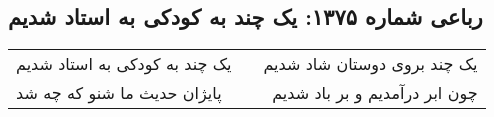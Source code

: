 \begin{center}
\section*{رباعی شماره ۱۳۷۵: یک چند به کودکی به استاد شدیم}
\label{sec:1375}
\begin{longtable}{l p{0.5cm} r}
یک چند به کودکی به استاد شدیم
&&
یک چند بروی دوستان شاد شدیم
\\
پایژان حدیث ما شنو که چه شد
&&
چون ابر درآمدیم و بر باد شدیم
\\
\end{longtable}
\end{center}
